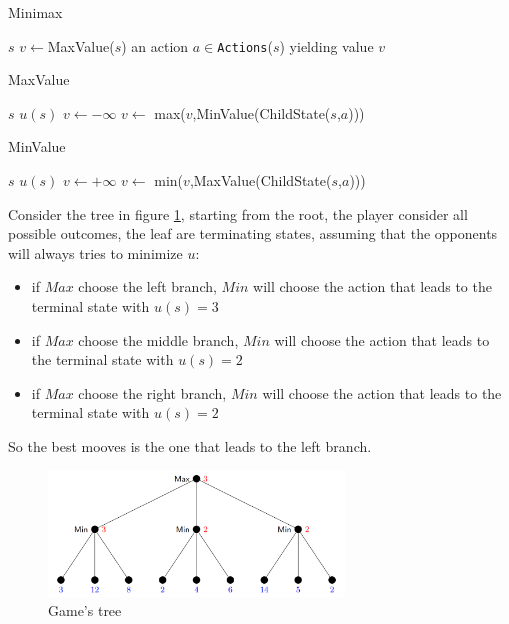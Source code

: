 \documentclass[10pt, letterpaper]{report}
\begin{document}
 \begin{algorithm}
    \caption{Minimax}\label{alg:minimax}
    \begin{algorithmic}
    \Require $s$
    \State $v\leftarrow$MaxValue($s$)
    \State\Return an action $a\in $\texttt{Actions}($s$) yielding value $v$
    \end{algorithmic}
\end{algorithm}
 \begin{algorithm}
    \caption{MaxValue}\label{alg:MaxValue}
    \begin{algorithmic}
    \Require $s$
    \State\Return $u(s)$
    \EndIf
    \State$v\leftarrow -\infty$
    \State $v\leftarrow$ max($v$,MinValue(ChildState($s$,$a$)))
    \EndFor 
    \end{algorithmic}
\end{algorithm}
 \begin{algorithm}
    \caption{MinValue}\label{alg:MinValue}
    \begin{algorithmic}
    \Require $s$
    \State\Return $u(s)$
    \EndIf
    \State$v\leftarrow +\infty$
    \State $v\leftarrow$ min($v$,MaxValue(ChildState($s$,$a$)))
    \EndFor 
    \end{algorithmic}
\end{algorithm}

Consider the tree in figure \ref{fig:minmax}, starting from the root, the player consider all possible outcomes, the leaf are terminating states, assuming that the opponents will always tries to minimize $u$:\begin{itemize}
    \item if $Max$ choose the left branch, $Min$ will choose the action that leads to the terminal state with $u(s)=3$
    \item if $Max$ choose the middle branch, $Min$ will choose the action that leads to the terminal state with $u(s)=2$
    \item if $Max$ choose the right branch, $Min$ will choose the action that leads to the terminal state with $u(s)=2$
\end{itemize}
So the best mooves is the one that leads to the left branch.
\begin{figure}[h!]
    \centering
    \includegraphics[width=0.7\textwidth ]{images/minmaxtree.png}
    \caption{Game's tree }
    \label{fig:minmax}
\end{figure}
\end{document}

